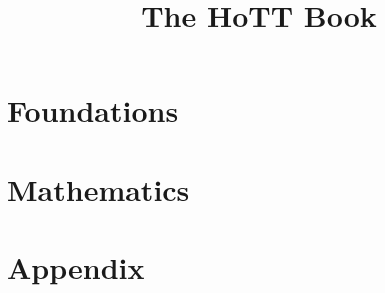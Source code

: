 \documentclass[openany,11pt]{book}
\renewcommand{\markboth}[2]{}
\renewcommand{\chaptermark}[1]{\markboth{\textsc{Chapter \thechapter. #1}}{}}
\renewcommand{\sectionmark}[1]{\markright{\textsc{\thesection\ #1}}}
\begin{document}
\title{The HoTT Book}




\setcounter{tocdepth}{1}        %
\tableofcontents
\setcounter{tocdepth}{2}        %



\part{Foundations}
\label{part:foundations}
\setcounter{chapter}{-2}




%









\part{Mathematics}
\label{part:mathematics}









\part{Appendix}

\appendix
\renewcommand{\chaptermark}[1]{\markboth{\textsc{Appendix \thechapter. #1}}{}}
\renewcommand{\sectionmark}[1]{\markright{\textsc{\thesection\ #1}}}










\end{document}
